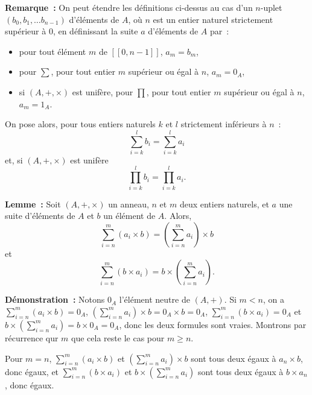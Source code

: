 \noindent\textbf{Remarque :} On peut étendre les définitions ci-dessus au cas d'un $n$-uplet $(b_0, b_1, \dots b_{n-1})$ d'éléments de $A$, où $n$ est un entier naturel strictement supérieur à $0$, en définissant la suite $a$ d'éléments de $A$ par : 
\begin{itemize}[nosep]
    \item pour tout élément $m$ de $[\![0, n-1]\!]$, $a_m = b_m$, 
    \item pour $\sum$, pour tout entier $m$ supérieur ou égal à $n$, $a_m = 0_A$, 
    \item si $(A, +, \times)$ est unifère, pour $\prod$, pour tout entier $m$ supérieur ou égal à $n$, $a_m = 1_A$.
\end{itemize}
On pose alors, pour tous entiers naturels $k$ et $l$ strictement inférieurs à $n$ : 
\begin{equation*}
    \sum_{i=k}^l b_i = \sum_{i=k}^l a_i
\end{equation*}
et, si $(A, +, \times)$ est unifère
\begin{equation*}
    \prod_{i=k}^l b_i = \prod_{i=k}^l a_i.
\end{equation*}

\medskip

\noindent\textbf{Lemme :} Soit $(A, +, \times)$ un anneau, $n$ et $m$ deux entiers naturels, et $a$ une suite d'éléments de $A$ et $b$ un élément de $A$. 
    Alors,
    \begin{equation*}
        \sum_{i=n}^m (a_i \times b) = \left( \sum_{i=n}^m a_i \right) \times b 
    \end{equation*}
    et
    \begin{equation*}
        \sum_{i=n}^m (b \times a_i) = b \times \left( \sum_{i=n}^m a_i \right) .
    \end{equation*}

\medskip

\noindent\textbf{Démonstration :} 
    Notons $0_A$ l'élément neutre de $(A, +)$.
    Si $m < n$, on a $\sum_{i=n}^m (a_i \times b) = 0_A$, $\left( \sum_{i=n}^m a_i \right) \times b = 0_A \times b = 0_A$, $\sum_{i=n}^m (b \times a_i) = 0_A$ et $b \times \left( \sum_{i=n}^m a_i \right) = b \times 0_A = 0_A$, donc les deux formules sont vraies.
    Montrons par récurrence qur $m$ que cela reste le cas pour $m \geq n$.

    Pour $m = n$, $\sum_{i=n}^m (a_i \times b)$ et $\left( \sum_{i=n}^m a_i \right) \times b$ sont tous deux égaux à $a_n \times b$, donc égaux, et $\sum_{i=n}^m (b \times a_i)$ et $b \times \left( \sum_{i=n}^m a_i \right)$ sont tous deux égaux à $b \times a_n$, donc égaux.

